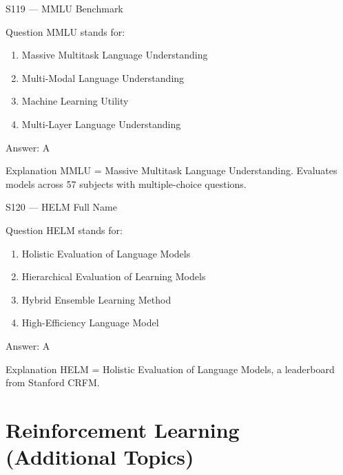 \documentclass[aspectratio=169,8pt]{beamer}
\begin{document}
	\begin{frame}{S119 --- MMLU Benchmark}
		\begin{block}{Question}
			MMLU stands for:
			\begin{enumerate}
				\item Massive Multitask Language Understanding
				\item Multi-Modal Language Understanding
				\item Machine Learning Utility
				\item Multi-Layer Language Understanding
			\end{enumerate}
		\end{block}
		\begin{exampleblock}{Answer: A}\end{exampleblock}
		\begin{block}{Explanation}
			MMLU = Massive Multitask Language Understanding. Evaluates models across 57 subjects with multiple-choice questions.
		\end{block}
	\end{frame}
	
	\begin{frame}{S120 --- HELM Full Name}
		\begin{block}{Question}
			HELM stands for:
			\begin{enumerate}
				\item Holistic Evaluation of Language Models
				\item Hierarchical Evaluation of Learning Models
				\item Hybrid Ensemble Learning Method
				\item High-Efficiency Language Model
			\end{enumerate}
		\end{block}
		\begin{exampleblock}{Answer: A}\end{exampleblock}
		\begin{block}{Explanation}
			HELM = Holistic Evaluation of Language Models, a leaderboard from Stanford CRFM.
		\end{block}
	\end{frame}
	
	\section{Reinforcement Learning (Additional Topics)}
	
\end{document}
